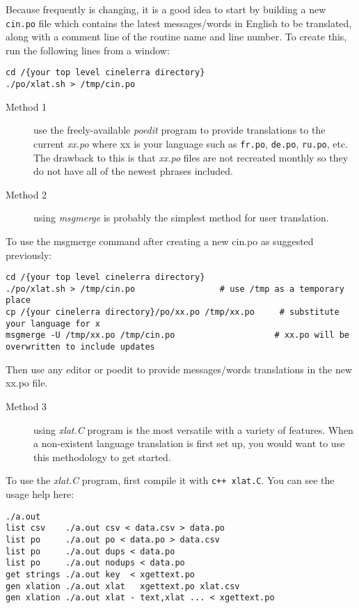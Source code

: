 Because \CGG{} frequently is changing, it is a good idea to start by building a new \texttt{cin.po} file which contains the latest messages/words in English to be translated, along with a comment line of the routine name and line number.  To create this, run the following lines from a window:

\begin{lstlisting}[numbers=none]
cd /{your top level cinelerra directory}
./po/xlat.sh > /tmp/cin.po
\end{lstlisting}

\begin{description}
	\item[Method 1]  use the freely-available \textit{poedit} program to provide translations to the current \textit{xx.po} where xx is your language such as \texttt{fr.po}, \texttt{de.po}, \texttt{ru.po}, etc.  The drawback to this is that \textit{xx.po} files are not recreated monthly so they do not have all of the newest phrases included.
	\item[Method 2] using \textit{msgmerge} is probably the simplest method for user translation.
\end{description}

To use the msgmerge command after creating a new cin.po as suggested previously:

\begin{lstlisting}[numbers=none]
cd /{your top level cinelerra directory}
./po/xlat.sh > /tmp/cin.po			       # use /tmp as a temporary place
cp /{your cinelerra directory}/po/xx.po /tmp/xx.po     # substitute your language for x
msgmerge -U /tmp/xx.po /tmp/cin.po                    # xx.po will be overwritten to include updates
\end{lstlisting}

Then use any editor or poedit to provide messages/words translations in the new xx.po file.

\begin{description}
	\item[Method 3 ] using \textit{xlat.C} program is the most versatile with a variety of features.  When a non-existent language translation is first set up, you would want to use this methodology to get started.
\end{description}

To use the \textit{xlat.C} program, first compile it with \texttt{c++ xlat.C}.  You can see the usage help here:

\begin{lstlisting}[numbers=none]
	./a.out 
list csv    ./a.out csv < data.csv > data.po
list po     ./a.out po < data.po > data.csv
list po     ./a.out dups < data.po
list po     ./a.out nodups < data.po
get strings ./a.out key  < xgettext.po
gen xlation ./a.out xlat   xgettext.po xlat.csv
gen xlation ./a.out xlat - text,xlat ... < xgettext.po
\end{lstlisting}


